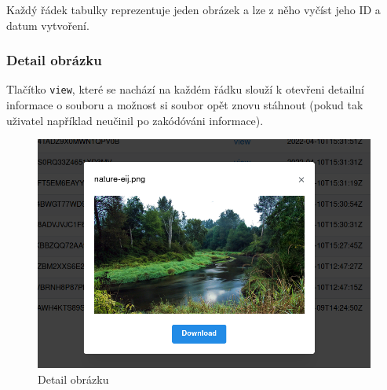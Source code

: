 Každý řádek tabulky reprezentuje jeden obrázek a lze z něho vyčíst jeho ID a
datum vytvoření.

\subsubsection{Detail obrázku}\label{subsubsec:detail-obrazku}
Tlačítko \texttt{view}, které se nachází na každém řádku slouží k otevřeni
detailní informace o souboru a možnost si soubor opět znovu stáhnout
(pokud tak uživatel například neučinil po zakódóváni informace).

\begin{figure}
    \centering
    \includegraphics[scale=0.5]{assets/images/image-detail}
    \caption{Detail obrázku}\label{fig:detail-obrazku}
\end{figure}
